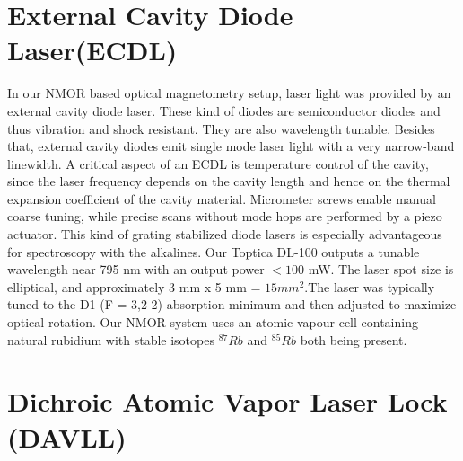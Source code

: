 \section{External Cavity Diode Laser(ECDL)}
\bigskip
In our NMOR based optical magnetometry setup, laser light was provided by an external cavity diode laser. These kind of diodes are semiconductor diodes and thus vibration and shock resistant. They are also wavelength tunable. Besides that, external cavity diodes emit single mode laser light with a very narrow-band linewidth. A critical aspect of an ECDL is temperature control of the cavity, since the laser frequency depends on the cavity length and hence on the thermal expansion coefficient of the cavity material. Micrometer screws enable manual coarse tuning, while precise scans without mode hops are performed by a piezo actuator. This kind of grating stabilized diode lasers is especially advantageous for spectroscopy with the alkalines. Our Toptica DL-100 outputs a tunable wavelength near 795 nm with an output power $<100$ mW. The laser spot size is elliptical, and approximately 3 mm x 5 mm = $15 mm^2$.The laser was typically tuned to the D1 (F = 3,2 2) absorption minimum and then adjusted to maximize optical rotation. Our NMOR system uses an atomic vapour cell containing natural rubidium with stable isotopes $^{87}Rb$ and $^{85}Rb$ both being present.

\section{Dichroic Atomic Vapor Laser Lock (DAVLL)}

